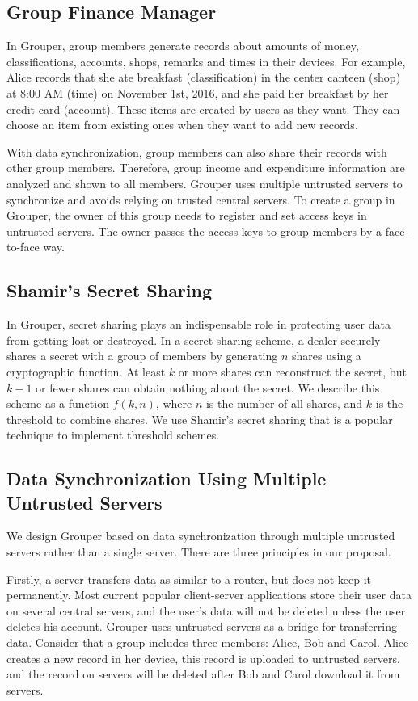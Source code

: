 \documentclass[twocolumn,10pt]{article}
\begin{document}
\subsection{Group Finance Manager}
 In Grouper, group members generate records about amounts of money, classifications, accounts, shops, remarks and times in their devices. For example, Alice records that she ate breakfast (classification) in the center canteen (shop) at 8:00 AM (time) on November 1st, 2016, and she paid her breakfast by her credit card (account). These items are created by users as they want. They can choose an item from existing ones when they want to add new records.

 With data synchronization, group members can also share their records with other group members. Therefore, group income and expenditure information are analyzed and shown to all members. Grouper uses multiple untrusted servers to synchronize and avoids relying on trusted central servers. To create a group in Grouper, the owner of this group needs to register and set access keys in untrusted servers. The owner passes the access keys to group members by a face-to-face way.

\subsection{Shamir's Secret Sharing}
In Grouper, secret sharing plays an indispensable role in protecting user data from getting lost or destroyed. In a secret sharing scheme, a dealer securely shares a secret with a group of members by generating $n$ shares using a cryptographic function\cite{smith2013layered}. At least $k$ or more shares can reconstruct the secret, but $k-1$ or fewer shares can obtain nothing about the secret\cite{pang2005new}. We describe this scheme as a function $f(k, n)$, where $n$ is the number of all shares, and $k$ is the threshold to combine shares.  We use Shamir's secret sharing that  is a popular technique to implement threshold schemes.

\subsection{Data Synchronization Using Multiple Untrusted Servers}

We design Grouper based on data synchronization through multiple untrusted servers rather than a single server. There are three principles in our proposal. 

Firstly, a server transfers data as similar to a router, but does not keep it permanently. Most current popular client-server applications store their user data on several central servers, and the user's data will not be deleted unless the user deletes his account. Grouper uses untrusted servers as a bridge for transferring data. Consider that a group includes three members: Alice, Bob and Carol. Alice creates a new record in her device, this record is uploaded to untrusted servers, and the record on servers will be deleted after Bob and Carol download it from servers.
\end{document}
